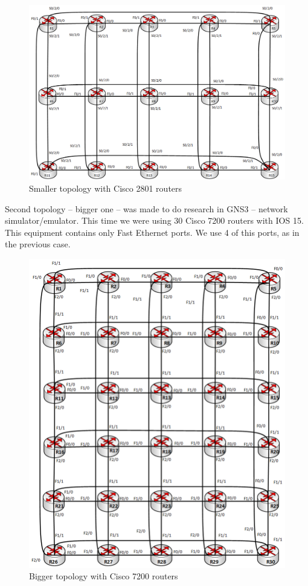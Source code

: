 \documentclass[conference,compsoc]{IEEEtran}
\begin{document}
\begin{figure}[p!]
  \centering
 \includegraphics[width=\textwidth] {images/f1.png}
  \caption{Smaller topology with Cisco 2801 routers}
\end{figure}

Second topology – bigger one – was made to do research in GNS3 – network simulator/emulator. This time we were using 30 Cisco 7200 routers with IOS 15. This equipment contains only Fast Ethernet ports. We use 4 of this ports, as in the previous case.


\begin{figure}[t!]
  \centering
  \includegraphics[width=\textwidth]{images/f2.png}
  \caption{Bigger topology with Cisco 7200 routers}
\end{figure}
\end{document}

